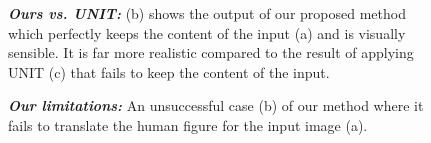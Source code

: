 \documentclass[10pt,twocolumn,letterpaper]{article}
\begin{document}
\begin{figure}[!htb]
\centering     %
{}

\caption{\textit{\textbf{Ours vs. UNIT:}}
(b) shows the output of our proposed method which perfectly keeps the content of the input (a) and is visually sensible. It is far more realistic compared to the result of applying UNIT \cite{liu2017unsupervised} (c) that fails to keep the content of the input.}
\label{fig:comparison}
\end{figure}

\begin{figure}[!htb]
\centering     %
{}

\caption{\textit{\textbf{Our limitations:}} An unsuccessful case (b) of our method where it fails to translate the human figure for the input image (a).}
\label{fig:limitation}
\end{figure}

{\small


}
\end{document}
